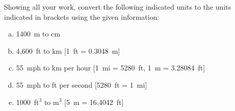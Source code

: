 \documentclass[11pt,letterpaper]{article}
\begin{document}

 Showing all your work, convert the following indicated units to the units indicated in brackets using the given information:
	\begin{enumerate}[(a)]
	\item 1400~m to cm
	\item 4,600~ft to km [1~ft = 0.3048~m]
	\item 55~mph to km per hour [1~mi = 5280~ft, 1~m = 3.28084~ft]
	\item 55~mph to ft per second [5280~ft = 1~mi]
	\item 1000~ft$^3$ to m$^3$ [5~m = 16.4042~ft]
	\end{enumerate} \pspace
\end{document}
